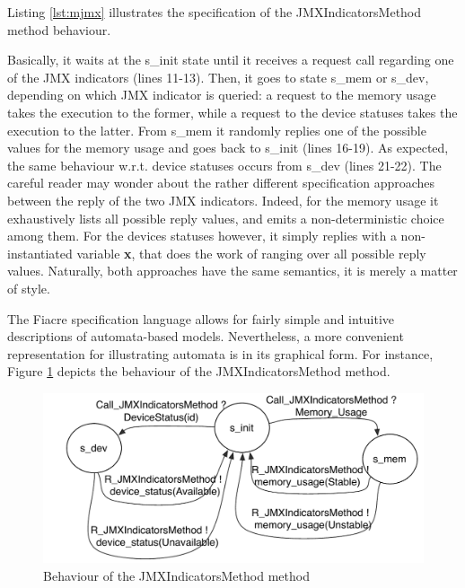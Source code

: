 	Listing \ref{lst:mjmx} illustrates the specification of the \textsf{JMXIndicatorsMethod} method behaviour.
	
				
	
	
	\noindent Basically, it waits at the \textsf{s\_init} state until it receives a request call regarding
	one of the \ac{JMX} indicators (lines 11-13). Then, it goes to state \textsf{s\_mem} or
	\textsf{s\_dev}, depending on which \ac{JMX} indicator is queried:
	a request to the memory usage takes the execution
	to the former, while a request to the device statuses takes the execution to the latter.
	From \textsf{s\_mem} it randomly replies one of the possible values for
	the memory usage and goes back to \textsf{s\_init} (lines 16-19). As expected, the 
	same behaviour w.r.t. device statuses occurs from \textsf{s\_dev} (lines 21-22).
	The careful reader may wonder about	the rather different specification approaches
	between the reply of the two \ac{JMX} indicators. Indeed, for the memory usage it 
	exhaustively lists all possible reply values, and emits a non-deterministic choice among them.
	For the devices statuses however, it simply replies with a non-instantiated variable \textbf{x},
	that does the work of ranging over all possible reply values. Naturally, both approaches have 
	the same semantics, it is merely a matter of style.
	
	
	The Fiacre specification language allows for fairly simple and intuitive descriptions of 
	automata-based models. Nevertheless, a more convenient representation for 
	illustrating automata is in its graphical form. For instance, Figure \ref{fig:JMX} depicts 	
	the behaviour of the \textsf{JMXIndicatorsMethod} method.	
	
	\begin{figure}[H]
		 \centering
		\includegraphics[scale=0.6]{figures/chapter3/JMXIndicatorsMethod.pdf}
		\caption{Behaviour of the JMXIndicatorsMethod method}
		\label{fig:JMX}		
	\end{figure}			
	
